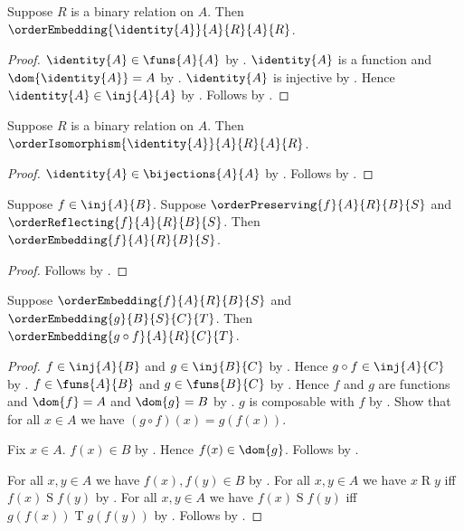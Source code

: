 \begin{proposition}\label{identity_order_embedding}
    Suppose $R$ is a binary relation on $A$.
    Then $\orderEmbedding{\identity{A}}{A}{R}{A}{R}$.
\end{proposition}
\begin{proof}
    $\identity{A}\in\funs{A}{A}$ by .
    $\identity{A}$ is a function and $\dom{\identity{A}}=A$ by
        .
    $\identity{A}$ is injective by .
    Hence $\identity{A}\in\inj{A}{A}$ by
        .
    Follows by .
\end{proof}

\begin{proposition}\label{identity_order_isomorphism}
    Suppose $R$ is a binary relation on $A$.
    Then $\orderIsomorphism{\identity{A}}{A}{R}{A}{R}$.
\end{proposition}
\begin{proof}
    $\identity{A}\in\bijections{A}{A}$ by
        .
    Follows by .
\end{proof}

\begin{proposition}\label{order_embedding_of_injective_preserving_reflecting}
    Suppose $f\in\inj{A}{B}$.
    Suppose $\orderPreserving{f}{A}{R}{B}{S}$ and
        $\orderReflecting{f}{A}{R}{B}{S}$.
    Then $\orderEmbedding{f}{A}{R}{B}{S}$.
\end{proposition}
\begin{proof}
    Follows by
        .
\end{proof}

\begin{proposition}\label{order_embedding_composition}
    Suppose $\orderEmbedding{f}{A}{R}{B}{S}$ and
        $\orderEmbedding{g}{B}{S}{C}{T}$.
    Then $\orderEmbedding{g\circ f}{A}{R}{C}{T}$.
\end{proposition}
\begin{proof}
    $f\in\inj{A}{B}$ and $g\in\inj{B}{C}$ by
        .
    Hence $g\circ f\in\inj{A}{C}$ by .
    $f\in\funs{A}{B}$ and $g\in\funs{B}{C}$ by
        .
    Hence $f$ and $g$ are functions and $\dom{f}=A$ and $\dom{g}=B$
        by .
    $g$ is composable with $f$ by .
    Show that for all $x\in A$ we have $(g\circ f)(x)=g(f(x))$.
    \begin{subproof}
        Fix $x\in A$.
        $f(x)\in B$ by .
        Hence $f(x)\in\dom{g}$.
        Follows by .
    \end{subproof}
    For all $x,y\in A$ we have $f(x),f(y)\in B$ by
        .
    For all $x,y\in A$ we have
        $x\mathrel{R}y$ iff $f(x)\mathrel{S}f(y)$ by
        .
    For all $x,y\in A$ we have
        $f(x)\mathrel{S}f(y)$ iff $g(f(x))\mathrel{T}g(f(y))$ by
        .
    Follows by .
\end{proof}


